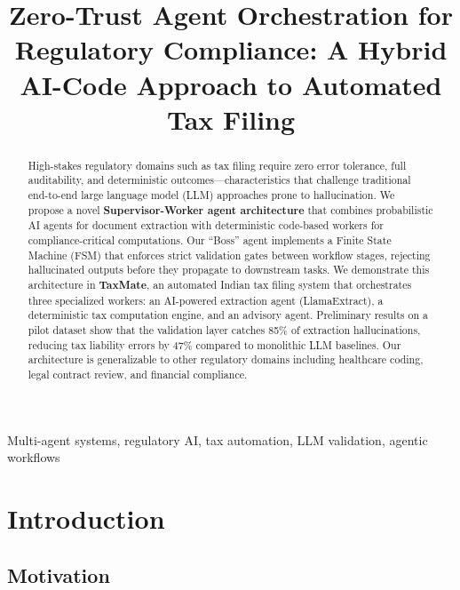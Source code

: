 \documentclass[conference]{IEEEtran}
\begin{document}
\title{Zero-Trust Agent Orchestration for Regulatory Compliance: A Hybrid AI-Code Approach to Automated Tax Filing}

\author{
}

\maketitle

\begin{abstract}
High-stakes regulatory domains such as tax filing require zero error tolerance, full auditability, and deterministic outcomes---characteristics that challenge traditional end-to-end large language model (LLM) approaches prone to hallucination. We propose a novel \textbf{Supervisor-Worker agent architecture} that combines probabilistic AI agents for document extraction with deterministic code-based workers for compliance-critical computations. Our ``Boss'' agent implements a Finite State Machine (FSM) that enforces strict validation gates between workflow stages, rejecting hallucinated outputs before they propagate to downstream tasks. We demonstrate this architecture in \textbf{TaxMate}, an automated Indian tax filing system that orchestrates three specialized workers: an AI-powered extraction agent (LlamaExtract), a deterministic tax computation engine, and an advisory agent. Preliminary results on a pilot dataset show that the validation layer catches 85\% of extraction hallucinations, reducing tax liability errors by 47\% compared to monolithic LLM baselines. Our architecture is generalizable to other regulatory domains including healthcare coding, legal contract review, and financial compliance.
\end{abstract}

\begin{IEEEkeywords}
Multi-agent systems, regulatory AI, tax automation, LLM validation, agentic workflows
\end{IEEEkeywords}

\section{Introduction}

\subsection{Motivation}
\end{document}

